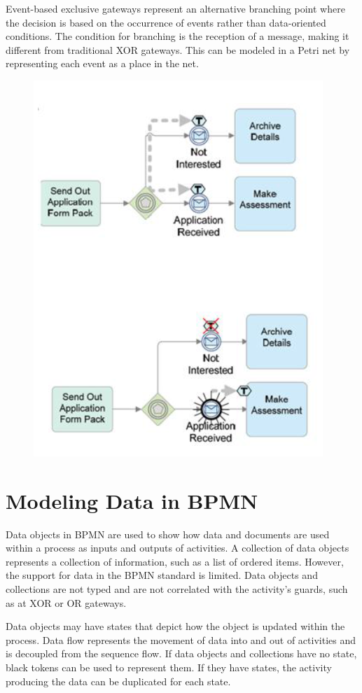 Event-based exclusive gateways represent an alternative branching point where the decision is based on the occurrence of events rather than data-oriented conditions. The condition for branching is the reception of a message, making it different from traditional XOR gateways. This can be modeled in a Petri net by representing each event as a place in the net.
\begin{figure}[h!]
    \centering
    \includegraphics[width=0.5\linewidth]{capitolo 9/17.png}
\end{figure}

\section{Modeling Data in BPMN}

Data objects in BPMN are used to show how data and documents are used within a process as inputs and outputs of activities. A collection of data objects represents a collection of information, such as a list of ordered items. However, the support for data in the BPMN standard is limited. Data objects and collections are not typed and are not correlated with the activity's guards, such as at XOR or OR gateways.

Data objects may have states that depict how the object is updated within the process. Data flow represents the movement of data into and out of activities and is decoupled from the sequence flow. If data objects and collections have no state, black tokens can be used to represent them. If they have states, the activity producing the data can be duplicated for each state.


